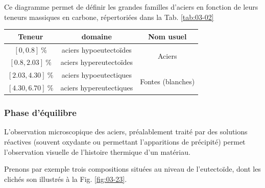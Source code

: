 \documentclass[a4paper,16pt]{book}
\begin{document}

Ce diagramme permet de définir les grandes familles d'aciers en fonction de leurs teneurs massiques en carbone, répertoriées dans la Tab. \ref{tab:03-02}

\begin{center}
\begin{minipage}{0.53\textwidth}
\centering
\begin{tabular}{ccc}
\toprule
Teneur & domaine & Nom usuel \\
\midrule
$[0, 0.8] ~ \si{\percent}$ & aciers hypoeutectoïdes & \multirow{2}{*}{Aciers}  \\ 
$[0.8, 2.03] ~ \si{\percent}$ & aciers hypereutectoïdes \\
\midrule
$[2.03, 4.30] ~ \si{\percent}$ & aciers hypoeutectiques & \multirow{2}{*}{Fontes (blanches)}\\
$[4.30, 6.70] ~ \si{\percent}$ & aciers hypereutectiques \\
\bottomrule
\end{tabular}
\end{minipage}\hfill\begin{minipage}{0.43\textwidth}
\label{tab:03-02}
\end{minipage}
\end{center}

\subsubsection{Phase d'équilibre}

L'observation microscopique des aciers, préalablement traité par des solutions réactives (souvent oxydante ou permettant l'apparitions de précipité) permet l'observation visuelle de l'histoire thermique d'un matériau.


Prenons par exemple trois compositions situées au niveau de l'eutectoïde, dont les clichés son illustrés à la Fig. \ref{fig:03-23}. 
\end{document}
